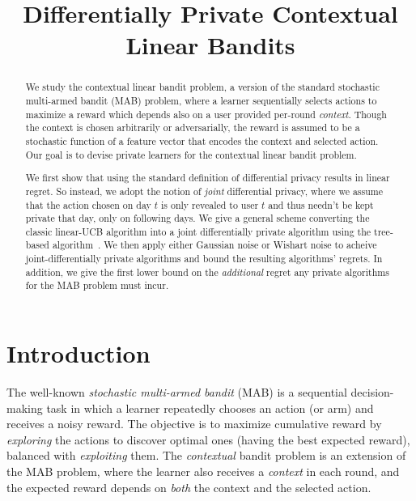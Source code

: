 \documentclass{article}
\title{Differentially Private Contextual Linear Bandits}
\begin{document}
\setlength{\intextsep}{4pt}
\setlength{\textfloatsep}{4pt}
\setlength{\abovedisplayskip}{3pt}
\setlength{\belowdisplayskip}{3pt}

\makeatletter{}\makeatother
\maketitle

\begin{abstract}
  We study the contextual linear bandit problem, a version of the
  standard stochastic multi-armed bandit (MAB) problem, where a learner
  sequentially selects actions to maximize a reward which
  depends also on a user provided per-round \emph{context}. Though the context
  is chosen arbitrarily or adversarially, the reward is assumed to
  be a stochastic function of a feature vector that encodes the
  context and selected action. Our goal is to devise private learners for the
  contextual linear bandit problem.

  We first show that using the standard definition of differential
  privacy results in linear regret. So instead, we adopt the notion of \emph{joint}
  differential privacy, where we assume that the action chosen on day
  $t$ is only revealed to user $t$ and thus needn't be kept private
  that day, only on following days. We give a general scheme
  converting the classic linear-UCB algorithm into a joint differentially
  private algorithm using the tree-based algorithm~\cite{ChanPrivateContinualRelease2010,DworkContinualObservation2010}.
  We then apply either Gaussian noise or Wishart noise to acheive joint-differentially private algorithms and bound the resulting algorithms' regrets. In addition, we give the first lower bound on the
  \emph{additional} regret any private algorithms for the MAB problem must incur.
 \end{abstract}

\section{Introduction}
\label{sec:introduction}

The well-known \emph{stochastic multi-armed bandit} (MAB) is a
sequential decision-making task in which a learner repeatedly chooses
an action (or arm) and receives a noisy reward.  The objective is to
maximize cumulative reward by \emph{exploring} the actions to discover
optimal ones (having the best expected reward), balanced with
\emph{exploiting} them.  The \emph{contextual} bandit problem is an
extension of the MAB problem, where the learner also receives a \emph{context} in
each round, and the expected reward depends on \emph{both} the context
and the selected action.
\end{document}
